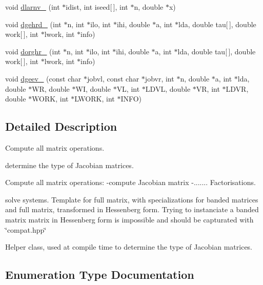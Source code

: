 \begin{DoxyCompactItemize}
\item 
void \hyperlink{namespaceodes_aee13c6130981afb5d561ed5a7d61f523}{dlarnv\+\_\+} (int $\ast$idist, int iseed\mbox{[}$\,$\mbox{]}, int $\ast$n, double $\ast$x)
\item 
void \hyperlink{namespaceodes_a8e1a54591e1e244caf5bdda4a798210d}{dgehrd\+\_\+} (int $\ast$n, int $\ast$ilo, int $\ast$ihi, double $\ast$a, int $\ast$lda, double tau\mbox{[}$\,$\mbox{]}, double work\mbox{[}$\,$\mbox{]}, int $\ast$lwork, int $\ast$info)
\item 
void \hyperlink{namespaceodes_adff449269843fe4af255e0956be12fd0}{dorghr\+\_\+} (int $\ast$n, int $\ast$ilo, int $\ast$ihi, double $\ast$a, int $\ast$lda, double tau\mbox{[}$\,$\mbox{]}, double work\mbox{[}$\,$\mbox{]}, int $\ast$lwork, int $\ast$info)
\item 
void \hyperlink{namespaceodes_aff86990f12f528839d2ff3b40ed98b1a}{dgeev\+\_\+} (const char $\ast$jobvl, const char $\ast$jobvr, int $\ast$n, double $\ast$a, int $\ast$lda, double $\ast$W\+R, double $\ast$W\+I, double $\ast$V\+L, int $\ast$L\+D\+V\+L, double $\ast$V\+R, int $\ast$L\+D\+V\+R, double $\ast$W\+O\+R\+K, int $\ast$L\+W\+O\+R\+K, int $\ast$I\+N\+F\+O)
\end{DoxyCompactItemize}


\subsection{Detailed Description}
Compute all matrix operations. 

determine the type of Jacobian matrices.

Compute all matrix operations\+: -\/compute Jacobian matrix -\/....... Factorisations.
\begin{DoxyItemize}
\item solve systems. Template for full matrix, with specializations for banded matrices and full matrix, transformed in Hessenberg form. Trying to instanciate a banded matrix matrix in Hessenberg form is impossible and should be capturated with \char`\"{}compat.\+hpp\char`\"{}
\end{DoxyItemize}

Helper class, used at compile time to determine the type of Jacobian matrices. 

\subsection{Enumeration Type Documentation}
\hypertarget{namespaceodes_a0e9924dcd4d2b0cedc36ec2eff4dcba8}{}
